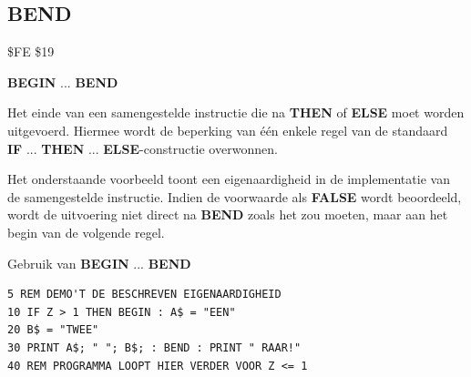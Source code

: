 \subsection{BEND}
\begin{description}[leftmargin=2cm,style=nextline]
\item [Token:]   \$FE \$19

\item [Formaat:]  {\bf BEGIN} ... {\bf BEND}

\item [Gebruik:]   Het einde van een samengestelde instructie die na {\bf THEN} of {\bf ELSE} moet worden uitgevoerd. Hiermee wordt de beperking van één enkele regel van de standaard {\bf IF} ... {\bf THEN} ... {\bf ELSE}-constructie overwonnen.

\item [Opmerkingen:] Het onderstaande voorbeeld toont een eigenaardigheid in de implementatie van de samengestelde instructie. Indien de voorwaarde als {\bf FALSE} wordt beoordeeld, wordt de uitvoering niet direct na {\bf BEND} zoals het zou moeten, maar aan het begin van de volgende regel.

\item [Voorbeeld:] Gebruik van {\bf BEGIN} ... {\bf BEND}

\begin{tcolorbox}[colback=black,coltext=white]
\verbatimfont{\codefont}
\begin{verbatim}
5 REM DEMO'T DE BESCHREVEN EIGENAARDIGHEID
10 IF Z > 1 THEN BEGIN : A$ = "EEN"
20 B$ = "TWEE"
30 PRINT A$; " "; B$; : BEND : PRINT " RAAR!"
40 REM PROGRAMMA LOOPT HIER VERDER VOOR Z <= 1
\end{verbatim}
\end{tcolorbox}
\end{description}


\newpage
